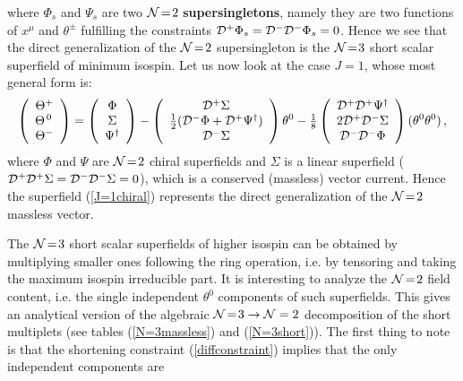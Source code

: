 \documentclass[a4paper,12pt]{article}
\newcommand{\ft}[2]{{\textstyle\frac{#1}{#2}}}
\newcommand{\eqn}[1]{(\ref{#1})}
\begin{document}
where $\Phi_s$ and $\Psi_s$ are two ${\cal N}\!=\!2$
{\bf supersingletons}, namely they are two functions of $x^\mu$
and $\theta^\pm$ fulfilling the constraints ${\cal D}^+\Phi_s=
{\cal D}^-{\cal D}^-\Phi_s=0$.
Hence we see that the direct generalization of the ${\cal N}\!=\!2$
supersingleton is the ${\cal N}\!=\!3$ short scalar superfield of
minimum isospin.
Let us now look at the case $J\!=\!1$, whose most general form is:
\begin{equation}
\left(\begin{array}{c}
\Theta^+\\
\Theta^{\,0\,}\\
\Theta^-
\end{array}\right)=\left(\begin{array}{c}
\Phi\\
\Sigma\\
\Psi^\dagger
\end{array}\right)-\left(\begin{array}{c}
{\cal D}^+\Sigma\\
\ft{1}{2}({\cal D}^-\Phi+{\cal D}^+\Psi^\dagger)\\
{\cal D}^-\Sigma
\end{array}\right)\theta^0-\ft{1}{8}\left(\begin{array}{c}
{\cal D}^+{\cal D}^+\Psi^\dagger\\
2{\cal D}^+{\cal D}^-\Sigma\\
{\cal D}^-{\cal D}^-\Phi
\end{array}\right)(\theta^0\theta^0)\,,\label{J=1chiral}
\end{equation}
where $\Phi$ and $\Psi$ are ${\cal N}\!=\!2$ chiral superfields
and $\Sigma$ is a linear superfield (${\cal D}^+{\cal D}^+\Sigma=
{\cal D}^-{\cal D}^-\Sigma=0$), which is a conserved (massless)
vector current.
Hence the superfield (\ref{J=1chiral}) represents the direct
generalization of the ${\cal N}\!=\!2$ massless vector.
\par
The ${\cal N}\!=\!3$ short scalar superfields of higher isospin can
be obtained by multiplying smaller ones following the ring operation,
i.e. by tensoring and taking the maximum isospin irreducible part.
It is interesting to analyze the ${\cal N}\!=\!2$ field content,
i.e. the single independent $\theta^0$ components of such superfields.
This gives an analytical version of the algebraic ${\cal N}\!=\!3\to
{\cal N}=2$ decomposition of the short multiplets (see tables
\eqn{N=3massless} and \eqn{N=3short}).
The first thing to note is that the shortening constraint
\eqn{diffconstraint} implies that the only independent components are
\end{document}
